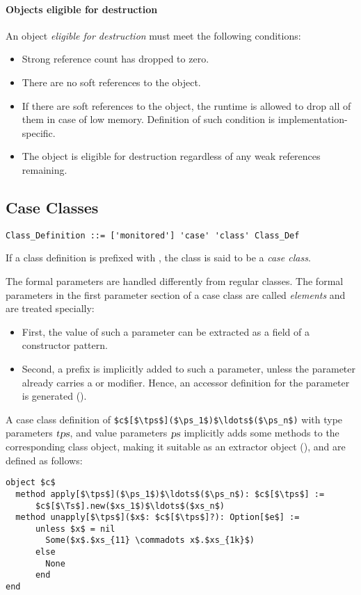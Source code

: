 \paragraph{Objects eligible for destruction}
An object {\em eligible for destruction} must meet the following conditions:
\begin{itemize}
  \item Strong reference count has dropped to zero. 
  \item There are no soft references to the object. 
  \item If there are soft references to the object, the runtime is allowed to drop all of them in case of low memory. Definition of such condition is implementation-specific. 
  \item The object is eligible for destruction regardless of any weak references remaining. 
\end{itemize}





\subsection{Case Classes}
\label{sec:case-classes}

\grammar\begin{lstlisting}
Class_Definition ::= ['monitored'] 'case' 'class' Class_Def
\end{lstlisting}

If a class definition is prefixed with , the class is said to be a {\em case class}. 

The formal parameters are handled differently from regular classes. The formal parameters in the first parameter section of a case class are called {\em elements} and are treated specially:
\begin{itemize}
\item[] First, the value of such a parameter can be extracted as a field of a constructor pattern. 
\item[] Second, a  prefix is implicitly added to such a parameter, unless the parameter already carries a  or  modifier. Hence, an accessor definition for the parameter is generated (). 
\end{itemize}

A case class definition of \lstinline!$c$[$\tps$]($\ps_1$)$\ldots$($\ps_n$)! with type parameters $\mbox{\sl tps}$, and value parameters $\mbox{\sl ps}$ implicitly adds some methods to the corresponding class object, making it suitable as an extractor object (), and are defined as follows:
\begin{lstlisting}
object $c$ 
  method apply[$\tps$]($\ps_1$)$\ldots$($\ps_n$): $c$[$\tps$] := 
      $c$[$\Ts$].new($xs_1$)$\ldots$($xs_n$)
  method unapply[$\tps$]($x$: $c$[$\tps$]?): Option[$e$] :=
      unless $x$ = nil
        Some($x$.$xs_{11} \commadots x$.$xs_{1k}$)
      else
        None
      end
end
\end{lstlisting}


